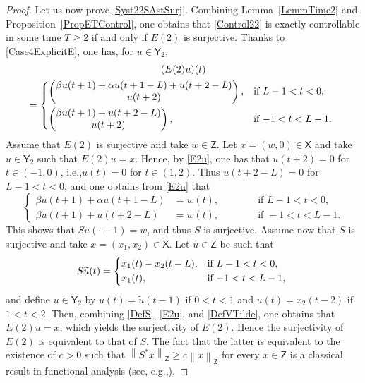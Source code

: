 \documentclass[10pt]{article}
\newcommand{\ie}{i.e.,\xspace}
\newcommand{\eg}{e.g.,\xspace}
\renewcommand{\eg}{e.g.,\xspace}
\theoremstyle{plain}
\theoremstyle{definition}
\newcommand{\norm}[1]{\left\lVert #1\right\lVert}
\numberwithin{equation}{section}\numberwithin{figure}{section}\emergencystretch=3em
\begin{document}
\begin{proof}
Let us now prove \eqref{Syst22SAstSurj}. Combining Lemma~\ref{LemmTime2} and Proposition~\ref{PropETControl}, one obtains that \eqref{Control22} is exactly controllable in some time $T \geq 2$ if and only if $E(2)$ is surjective. Thanks to \eqref{Case4ExplicitE}, one has, for $u \in \mathsf Y_2$,\vspace*{-3pt}
\begin{multline}
\label{E2u}
(E(2) u)(t)\\ =
\begin{dcases*}
\begin{pmatrix}
\beta u(t + 1) + \alpha u(t + 1 - L) + u(t + 2 - L) \\
u(t + 2) \\
\end{pmatrix}, & if $L - 1 < t < 0$, \\
\begin{pmatrix}
\beta u(t + 1) + u(t + 2 - L) \\
u(t + 2) \\
\end{pmatrix}, & if $-1 < t < L - 1$.
\end{dcases*}
\end{multline}
Assume that $E(2)$ is surjective and take $w \in \mathsf Z$. Let $x = (w, 0) \in \mathsf X$ and take $u \in \mathsf Y_2$ such that $E(2) u = x$. Hence, by \eqref{E2u}, one has that $u(t + 2) = 0$ for $t \in (-1, 0)$, \ie $u(t) = 0$ for $t \in (1, 2)$. Thus $u(t + 2 - L) = 0$ for $L - 1 < t < 0$, and one obtains from \eqref{E2u} that
\[
\left\{
\begin{aligned}
\beta u(t + 1) + \alpha u(t + 1 - L) & = w(t), & \qquad & \text{ if } L - 1 < t < 0, \\
\beta u(t + 1) + u(t + 2 - L) & = w(t), & & \text{ if } -1 < t < L - 1.
\end{aligned}
\right.
\]
This shows that $S u(\cdot + 1) = w$, and thus $S$ is surjective. Assume now that $S$ is surjective and take $x = (x_1, x_2) \in \mathsf X$. Let $\widetilde u \in \mathsf Z$ be such that
\begin{equation}
\label{DefVTilde}
S \widetilde u(t) =
\begin{dcases*}
x_1(t) - x_2(t - L), & if $L - 1 < t < 0$, \\
x_1(t), & if $-1 < t < L - 1$,
\end{dcases*}
\end{equation}
and define $u \in \mathsf Y_2$ by $u(t) = \widetilde u(t - 1)$ if $0 < t < 1$ and $u(t) = x_2(t - 2)$ if $1 < t < 2$. Then, combining \eqref{DefS}, \eqref{E2u}, and \eqref{DefVTilde}, one obtains that $E(2) u = x$, which yields the surjectivity of $E(2)$. Hence the surjectivity of $E(2)$ is equivalent to that of $S$. The fact that the latter is equivalent to the existence of $c > 0$ such that $\norm{S^\ast x}_{\mathsf Z} \geq c \norm{x}_{\mathsf Z}$ for every $x \in \mathsf Z$ is a classical result in functional analysis (see, \eg \cite[Th.\,4.13]{Rudin1991Functional}).
\end{proof}
\end{document}
